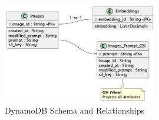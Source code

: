 \documentclass{article}
\begin{document}
\begin{figure}[h!]
    \centering
    \includegraphics[width=0.6\textwidth]{uml/schemas.png} %
    \caption{DynamoDB Schema and Relationships}
    \label{fig:schema}
\end{figure}

\end{document}
